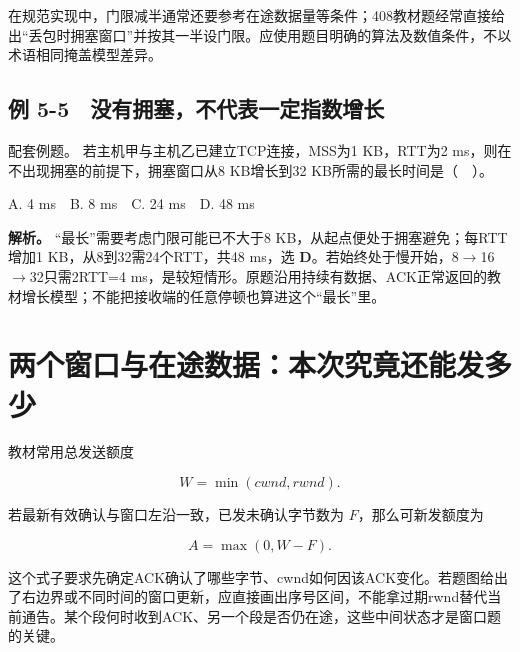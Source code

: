 在规范实现中，门限减半通常还要参考在途数据量等条件；408教材题经常直接给出``丢包时拥塞窗口''并按其一半设门限。应使用题目明确的算法及数值条件，不以术语相同掩盖模型差异。

\subsection{例 5-5　没有拥塞，不代表一定指数增长}\label{CN05-ex5}

\begin{example}[配套例题]

配套例题。 若主机甲与主机乙已建立TCP连接，MSS为1 KB，RTT为2 ms，则在不出现拥塞的前提下，拥塞窗口从8 KB增长到32 KB所需的最长时间是（　）。

A. 4 ms　B. 8 ms　C. 24 ms　D. 48 ms

\end{example}

\textbf{解析。} ``最长''需要考虑门限可能已不大于8 KB，从起点便处于拥塞避免；每RTT增加1 KB，从8到32需24个RTT，共48 ms，选 \textbf{D}。若始终处于慢开始，8\ensuremath{\to}16\ensuremath{\to}32只需2RTT=4 ms，是较短情形。原题沿用持续有数据、ACK正常返回的教材增长模型；不能把接收端的任意停顿也算进这个``最长''里。

\section{两个窗口与在途数据：本次究竟还能发多少}\label{CN05-09}

教材常用总发送额度

\[W=\min(cwnd,rwnd).\]

若最新有效确认与窗口左沿一致，已发未确认字节数为 \(F\)，那么可新发额度为

\[A=\max(0,W-F).\]

这个式子要求先确定ACK确认了哪些字节、cwnd如何因该ACK变化。若题图给出了右边界或不同时间的窗口更新，应直接画出序号区间，不能拿过期rwnd替代当前通告。某个段何时收到ACK、另一个段是否仍在途，这些中间状态才是窗口题的关键。

